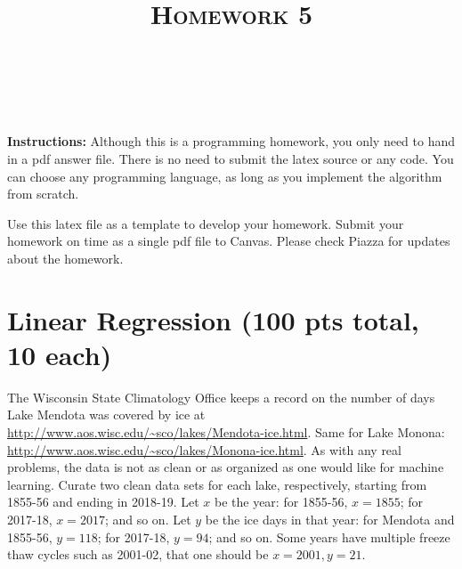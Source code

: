 \documentclass[a4paper]{article}
\title{\textsc{Homework 5}} %
\author{
\red{$>>$NAME HERE$<<$} \\
\red{$>>$ID HERE$<<$}\\
}
\date{}
\theoremstyle{definition}
\begin{document}
\maketitle 


\textbf{Instructions:} 
Although this is a programming homework, you only need to hand in a pdf answer file.
There is no need to submit the latex source or any code.
You can choose any programming language, as long as you implement the algorithm from scratch. 

Use this latex file as a template to develop your homework.
Submit your homework on time as a single pdf file to Canvas.
Please check Piazza for updates about the homework.



\section*{Linear Regression (100 pts total, 10 each)}

The Wisconsin State Climatology Office keeps a record on
the number of days Lake Mendota was covered by ice at
\url{http://www.aos.wisc.edu/~sco/lakes/Mendota-ice.html}.
Same for Lake Monona:
\url{http://www.aos.wisc.edu/~sco/lakes/Monona-ice.html}.
As with any real problems, the data is not as clean or as organized as one would like for machine learning.
Curate two clean data sets for each lake, respectively, starting from 1855-56 and ending in 2018-19.
Let $x$ be the year: for 1855-56, $x=1855$; for 2017-18, $x=2017$; and so on.
Let $y$ be the ice days in that year: for Mendota and 1855-56, $y=118$; for 2017-18, $y=94$; and so on.
Some years have multiple freeze thaw cycles such as 2001-02, that one should be $x=2001, y=21$.
\end{document}
